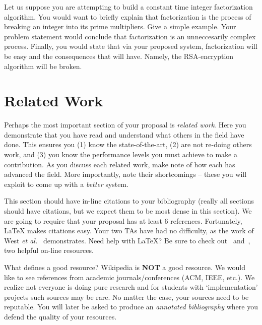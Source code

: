 \documentclass{sig-alternate}
\begin{document}
Let us suppose you are attempting to build a constant time integer factorization algorithm. You would want to briefly explain that factorization is the process of breaking an integer into its prime multipliers. Give a simple example. Your problem statement would conclude that factorization is an unneccesarily complex process. Finally, you would state that via your proposed system, factorization will be easy and the consequences that will have. Namely, the RSA-encryption algorithm will be broken.

\section{Related Work}
\label{sec:related_work}
Perhaps the most important section of your proposal is \textit{related work}. Here you demonstrate that you have read and understand what others in the field have done. This ensures you (1) know the state-of-the-art, (2) are not re-doing others work, and (3) you know the performance levels you must achieve to make a contribution. As you discuss each related work, make note of how each has advanced the field. More importantly, note their shortcomings -- these you will exploit to come up with a \textit{better} system. 

This section should have in-line citations to your bibliography (really all sections should have citations, but we expect them to be most dense in this section). We are going to require that your proposal has at least $6$ references. Fortunately, \LaTeX{} makes citations easy. Your two TAs have had no difficulty, as the work of West \textit{et al.}~\cite{quantm} demonstrates. Need help with \LaTeX{}? Be sure to check out~\cite{latex_wikibook} and~\cite{ctan_pdf}, two helpful on-line resources.

What defines a good resource? Wikipedia is \textbf{NOT} a good resource. We would like to see references from academic journals/conferences (ACM, IEEE, etc.). We realize not everyone is doing pure research and for students with `implementation' projects such sources may be rare. No matter the case, your sources need to be reputable. You will later be asked to produce an \textit{annotated bibliography} where you defend the quality of your resources.
\end{document}
